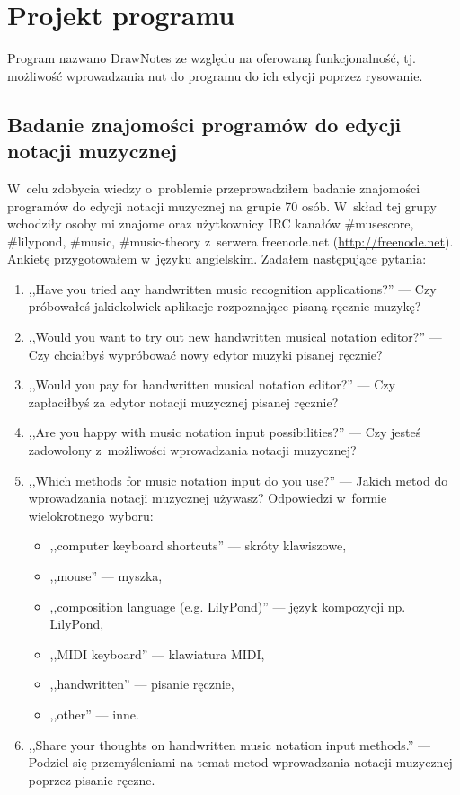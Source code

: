 \documentclass[polish,thesis,12pt]{dcsbook}
\begin{document}
\chapter{Projekt programu}
Program nazwano DrawNotes ze względu na oferowaną funkcjonalność, tj. możliwość wprowadzania nut do programu do ich edycji poprzez rysowanie.

\section{Badanie znajomości programów do edycji notacji muzycznej}
W~celu zdobycia wiedzy o~problemie przeprowadziłem badanie znajomości programów do edycji notacji muzycznej na grupie 70 osób. W~skład tej grupy wchodziły osoby mi znajome oraz użytkownicy IRC kanałów \#musescore, \#lilypond, \#music, \#music-theory z~serwera freenode.net (\url{http://freenode.net}). Ankietę przygotowałem w~języku angielskim. Zadałem następujące pytania:

\begin{enumerate}
  \item ,,Have you tried any handwritten music recognition applications?'' --- Czy próbowałeś jakiekolwiek aplikacje rozpoznające pisaną ręcznie muzykę?
  \item ,,Would you want to try out new handwritten musical notation editor?'' --- Czy chciałbyś wypróbować nowy edytor muzyki pisanej ręcznie?
  \item ,,Would you pay for handwritten musical notation editor?'' --- Czy zapłaciłbyś za edytor notacji muzycznej pisanej ręcznie?
  \item ,,Are you happy with music notation input possibilities?'' --- Czy jesteś zadowolony z~możliwości wprowadzania notacji muzycznej?
  \item ,,Which methods for music notation input do you use?'' --- Jakich metod do wprowadzania notacji muzycznej używasz? Odpowiedzi w~formie wielokrotnego wyboru:
        \begin{itemize}
          \item ,,computer keyboard shortcuts'' --- skróty klawiszowe,
          \item ,,mouse'' --- myszka,
          \item ,,composition language (e.g. LilyPond)'' --- język kompozycji np. LilyPond,
          \item ,,MIDI keyboard'' --- klawiatura MIDI,
          \item ,,handwritten'' --- pisanie ręcznie,
          \item ,,other'' --- inne.
        \end{itemize}
  \item ,,Share your thoughts on handwritten music notation input methods.'' --- Podziel się przemyśleniami na temat metod wprowadzania notacji muzycznej poprzez pisanie ręczne.
\end{enumerate}
\end{document}
